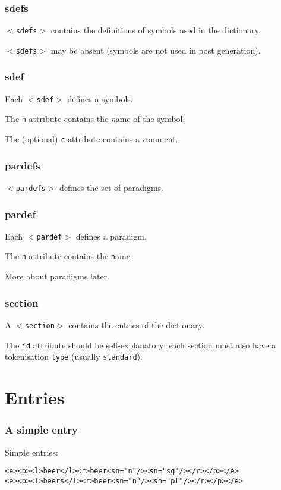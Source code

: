 \documentclass{beamer} %
\begin{document}
\begin{frame}
  \frametitle{sdefs}

  {\tt $<$sdefs$>$} contains the definitions of symbols used
  in the dictionary.

  {\tt $<$sdefs$>$} may be absent (symbols are not used
  in post generation).
\end{frame}

\begin{frame}
  \frametitle{sdef}

  Each {\tt $<$sdef$>$} defines a symbols.

  The {\tt n} attribute contains the {\it n}ame of the symbol.

  The (optional) {\tt c} attribute contains a {\it c}omment.

\end{frame}

\begin{frame}
  \frametitle{pardefs}

  {\tt $<$pardefs$>$} defines the set of paradigms.

\end{frame}

\begin{frame}
  \frametitle{pardef}

  Each {\tt $<$pardef$>$} defines a paradigm.

  The {\tt n} attribute contains the {\tt n}ame.

  \pause

  More about paradigms later.

\end{frame}

\begin{frame}
  \frametitle{section}

  A {\tt $<$section$>$} contains the entries of the dictionary.

  The {\tt id} attribute should be self-explanatory; each section must 
  also have a tokenisation {\tt type} (usually {\tt standard}). 

\end{frame}

\section{Entries}

\begin{frame}
  \frametitle{A simple entry}

  \begin{exampleblock}{Simple entries:}
    \begin{footnotesize}
    \begin{alltt}
      <e><p><l>beer</l><r>beer<s n="n"/><s n="sg"/></r></p></e> \\
      <e><p><l>beers</l><r>beer<s n="n"/><s n="pl"/></r></p></e>
    \end{alltt}
    \end{footnotesize}
\end{exampleblock}


\end{frame}
\end{document}
